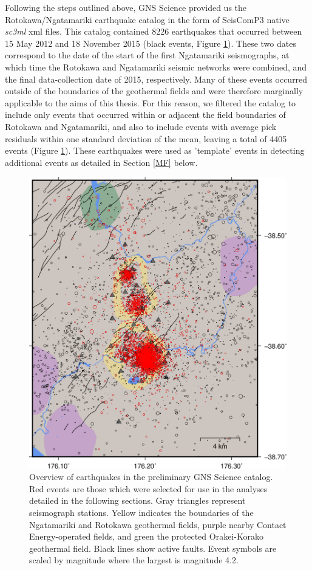 Following the steps outlined above, GNS Science provided us the Rotokawa\slash{Ngatamariki} earthquake catalog in the form of SeisComP3 native \textit{sc3ml} xml files. This catalog contained 8226 earthquakes that occurred between 15 May 2012 and 18 November 2015 (black events, Figure \ref{955268}). These two dates correspond to the date of the start of the first Ngatamariki seismographs, at which time the Rotokawa and Ngatamariki seismic networks were combined, and the final data-collection date of 2015, respectively. Many of these events occurred outside of the boundaries of the geothermal fields and were therefore marginally applicable to the aims of this thesis. For this reason, we filtered the catalog to include only events that occurred within or adjacent the field boundaries of Rotokawa and Ngatamariki, and also to include events with average pick residuals within one standard deviation of the mean, leaving a total of 4405 events (Figure \ref{955268}). These earthquakes were used as 'template' events in detecting additional events as detailed in Section \ref{MF} below.

\begin{figure}[h!]
\begin{center}
\includegraphics[width=0.70\columnwidth]{Chapter_2_Data/figures/RotNga_catalog_overview/RotNga_catalog_overview_original}
\caption{{Overview of earthquakes in the preliminary GNS Science catalog. Red
events are those which were selected for use in the analyses detailed in
the following sections. Gray triangles represent seismograph stations.
Yellow indicates the boundaries of the Ngatamariki and Rotokawa
geothermal fields, purple nearby Contact Energy-operated fields, and
green the protected Orakei-Korako geothermal field. Black lines show
active faults. Event symbols are scaled by magnitude where the largest
is magnitude 4.2.
{\label{955268}}%
}}
\end{center}
\end{figure}

